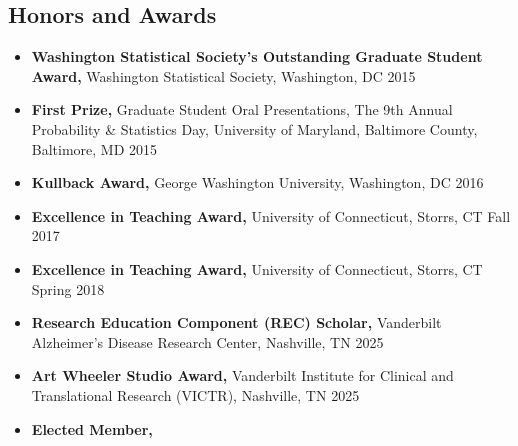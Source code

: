\documentclass[12pt,letterpaper]{article}
\newenvironment{cventry}{\begin{minipage}[t]{\linewidth}}{\end{minipage}}
\begin{document}
	\subsection*{Honors and Awards}
	\begin{itemize}
		\item\begin{cventry} {\bf Washington Statistical Society's Outstanding Graduate 
		Student Award,} Washington Statistical Society, Washington, DC \hfill 
		2015
		\par\end{cventry}
		\item\begin{cventry} {\bf First Prize,} Graduate Student Oral 
		Presentations, The 9th Annual Probability \& Statistics Day,  
		University of Maryland, Baltimore County, Baltimore, MD 
		\hfill 2015
		\par\end{cventry}
		\item\begin{cventry} {\bf Kullback Award,} George Washington University, Washington, 
		DC \hfill 2016
		\par\end{cventry}
		\item\begin{cventry} {\bf Excellence in Teaching Award,} 
		University of Connecticut, Storrs, CT \hfill Fall 2017
		\par\end{cventry}
		\item\begin{cventry} {\bf Excellence in Teaching Award,} 
		University of Connecticut, Storrs, CT \hfill Spring 2018
		\par\end{cventry}
		\item\begin{cventry} {\bf Research Education Component (REC) 
		Scholar,} Vanderbilt Alzheimer's Disease Research Center, 
		Nashville, TN \hfill 2025
		\par\end{cventry}
		\item\begin{cventry} {\bf Art Wheeler Studio Award,}  
		Vanderbilt Institute for Clinical and Translational Research 
		(VICTR), Nashville, TN \hfill 2025
		\par\end{cventry}
		\item\begin{cventry} {\bf Elected Member,} 

\end{cventry}
\end{itemize}
\end{document}
